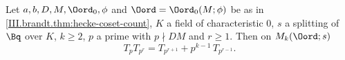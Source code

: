 Let $a,b,D,M,\Oord_0,\phi$ and $\Oord=\Oord_0(M;\phi)$ be as in \cref{III.brandt.thm:hecke-coset-count}, $K$ a field of characteristic $0$, $s$ a
splitting of $\Bq$ over $K$, $k\ge2$, $p$ a prime with $p\nmid DM$ and $r\ge1$. Then on $M_k(\Oord;s)$
\[
  T_pT_{p^r}=T_{p^{r+1}}+p^{k-1}\,T_{p^{r-1}}.
\]
